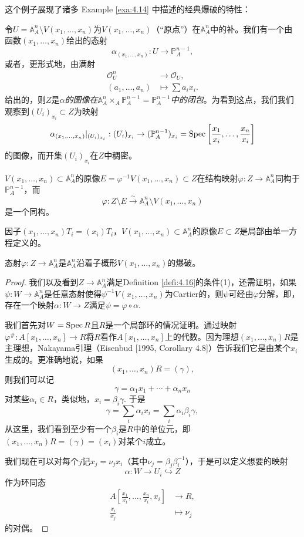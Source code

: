 这个例子展现了诸多 Example \ref{exa:4.14} 中描述的经典爆破的特性：
\begin{compactenum}[(1)]
	\item 令$U=\mathbb A_A^n\setminus V(x_1,\dots,x_n)$为$V(x_1,\dots,x_n)$（“原点”）在$\mathbb A_A^n$中的补。我们有一个由函数$(x_1,\dots,x_n)$给出的态射
	\[
		\alpha_{(x_1,\dots,x_n)}:U\to \mathbb P_A^{n-1},
	\]
	或者，更形式地，由满射
	\[
		\begin{aligned}
			\mathscr O_U^n & \longrightarrow \mathscr O_U,\\
			(a_1,\dots,a_n)&\longmapsto \sum a_ix_i.
		\end{aligned}
	\]
	给出的，则$Z$是\textit{$\alpha$的图像在$\mathbb A_A^n\times_A \mathbb P_A^{n-1}=\mathbb P_A^{n-1}$中的闭包}。为看到这点，我们我们观察到$(U_i)_{x_i}\subset Z$为映射
	\[
		\alpha_{(x_1,\dots,x_n)}|_{(U_i)_{x_i}}:(U_i)_{x_i}\to (\mathbb P_A^{n-1})_{x_i}=\operatorname{Spec} \left[\frac{x_1}{x_i},\dots,\frac{x_n}{x_i}\right]
	\]
	的图像，而开集$(U_i)_{x_i}$在$Z$中稠密。
	\item $V(x_1,\dots,x_n)\subset \mathbb A_A^n$的原像$E=\varphi^{-1}V(x_1,\dots,x_n)\subset Z$在结构映射$\varphi:Z\to \mathbb A_A^n$同构于$\mathbb P_A^{n-1}$，而
	\[
		\varphi:Z\setminus E\xrightarrow{\sim}\mathbb A_A^n\setminus V(x_1,\dots,x_n)
	\]
	是一个同构。
	\item 因子$(x_1,\dots,x_n)T_i=(x_i)T_i$，$V(x_1,\dots,x_n)\subset \mathbb A_A^n$的原像$E\subset Z$是局部由单一方程定义的。
\end{compactenum}

\begin{pro}\label{pro:4.18}
	态射$\varphi:Z\to \mathbb A_A^n$是$\mathbb A_A^n$沿着子概形$V(x_1,\dots,x_n)$的爆破。
\end{pro}

\begin{proof}
	我们以及看到$Z\to \mathbb A_A^n$满足Definition \ref{defi:4.16}的条件(1)，还需证明，如果$\psi:W\to \mathbb A_A^n$是任意态射使得$\psi^{-1}V(x_1,\dots,x_n)$为Cartier的，则$\psi$可经由$\varphi$分解，即，存在一个映射$\alpha:W\to Z$满足$\psi=\varphi\circ\alpha$.

	我们首先对$W=\operatorname{Spec} R$且$R$是一个局部环的情况证明。通过映射$\varphi^\#:A[x_1,\dots,x_n]\to R$将$R$看作$A[x_1,\dots,x_n]$上的代数。因为理想$(x_1,\dots,x_n)R$是主理想，Nakayama引理（Eisenbud [1995, Corollary 4.8]）告诉我们它是由某个$x_i$生成的。更准确地说，如果
	\[
		(x_1,\dots,x_n)R=(\gamma),
	\]
	则我们可以记
	\[
		\gamma=\alpha_1 x_1+\cdots +\alpha_n x_n
	\]
	对某些$\alpha_i\in R$，类似地，$x_i=\beta_i\gamma$. 于是
	\[
		\gamma=\sum_i \alpha_i x_i=\sum_i \alpha_i \beta_i \gamma,
	\]
	从这里，我们看到至少有一个$\beta_i$是$R$中的单位元，即$(x_1,\dots,x_n)R=(\gamma)=(x_i)$对某个$i$成立。

	我们现在可以对每个$j$记$x_j=\nu_j x_i$（其中$\nu_j=\beta_j\beta_i^{-1}$），于是可以定义想要的映射
	\[
		\alpha:W\to U_i\hookrightarrow Z
	\]
	作为环同态
	\[
	\begin{aligned}
		A\left[\frac{x_1}{x_i},\dots,\frac{x_n}{x_i},x_i\right] & \longrightarrow R,\\
		\frac{x_i}{x_j}&\longmapsto \nu_j
	\end{aligned}
	\]
	的对偶。
	\nottran
\end{proof}


